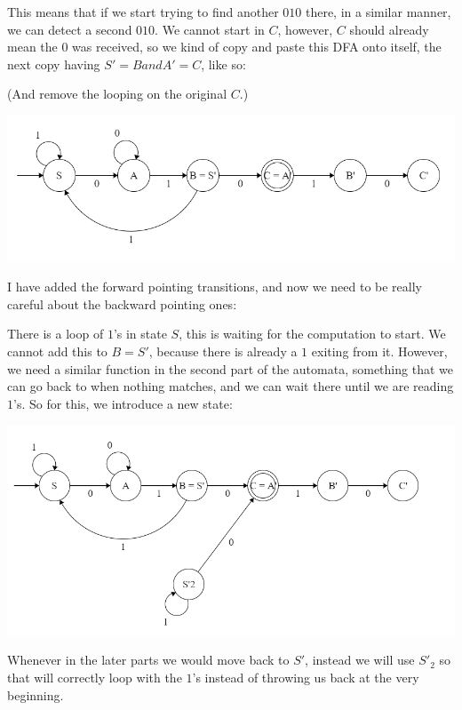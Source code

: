 This means that if we start trying to find another $010$ there, in a similar manner, we can detect a second $010$. We cannot start in $C$, however, $C$ should already mean the $0$ was received, so we kind of copy and paste this DFA onto itself, the next copy having $S' = B and A' = C$, like so:

(And remove the looping on the original $C$.)

\begin{center}
    \includegraphics[width=\linewidth]{./exams/02/step_2.png}
\end{center}

I have added the forward pointing transitions, and now we need to be really careful about the backward pointing ones:

There is a loop of $1$'s in state $S$, this is waiting for the computation to start. We cannot add this to $B=S'$, because there is already a $1$ exiting from it. However, we need a similar function in the second part of the automata, something that we can go back to when nothing matches, and we can wait there until we are reading $1$'s. So for this, we introduce a new state:

\begin{center}
    \includegraphics[width=\linewidth]{./exams/02/step_3.png}
\end{center}

Whenever in the later parts we would move back to $S'$, instead we will use $S'_2$ so that will correctly loop with the $1$'s instead of throwing us back at the very beginning.

